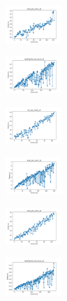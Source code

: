 \begin{figure}[H]
\begin{subfigure}
        \centering
        \includegraphics[width=0.234\textwidth]{img/bl/rand_set_const_10_277451237_time.png}
    \end{subfigure}
    \hfill
    \begin{subfigure}
        \centering
        \includegraphics[width=0.234\textwidth]{img/bl/newthyroid_set_const_10_277451237_time.png}
    \end{subfigure}
    \hfill
    \begin{subfigure}
        \centering
        \includegraphics[width=0.234\textwidth]{img/bl/iris_set_const_10_49258669_time.png}
    \end{subfigure}
    \hfill
    \begin{subfigure}
        \centering
        \includegraphics[width=0.234\textwidth]{img/bl/ecoli_set_const_10_49258669_time.png}
    \end{subfigure}
    \hfill
    \begin{subfigure}
        \centering
        \includegraphics[width=0.234\textwidth]{img/bl/rand_set_const_10_49258669_time.png}
    \end{subfigure}
    \hfill
    \begin{subfigure}
        \centering
        \includegraphics[width=0.234\textwidth]{img/bl/newthyroid_set_const_10_49258669_time.png}

\end{subfigure}
\end{figure}
